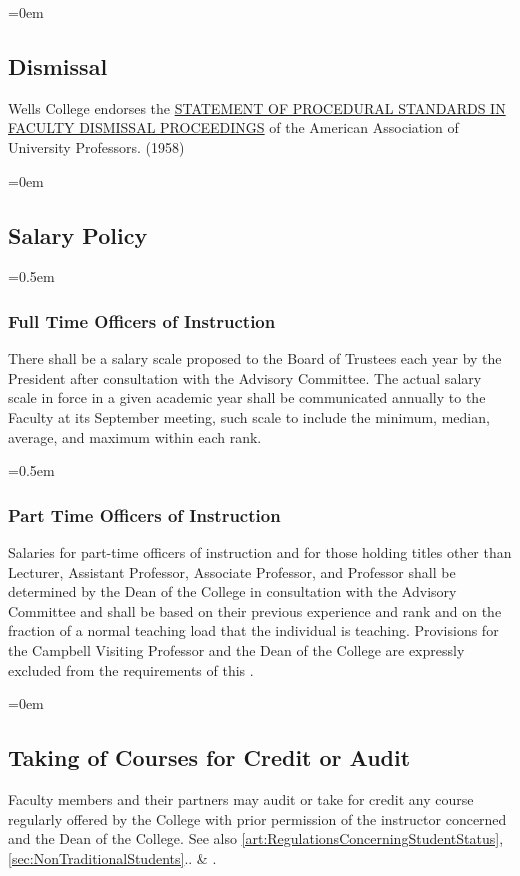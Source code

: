 \documentclass{manual}
\let\oldsubsection\subsection
\renewcommand\subsection{\leftskip=0em\oldsubsection}
\let\oldsubsubsection\subsubsection
\renewcommand\subsubsection{\leftskip=0.5em\oldsubsubsection}
\begin{document}
\subsection{Dismissal}\label{sec:Dismissal}
Wells College endorses the \href{http://www.aaup.org/AAUP/pubsres/policydocs/contents/statementon+proceduralstandardsinfaculty+dismissal+proceedings.htm}{STATEMENT OF PROCEDURAL STANDARDS IN FACULTY DISMISSAL PROCEEDINGS} of the American Association of University Professors. (1958)

\subsection{Salary Policy}\label{sec:SalaryPolicy}

\subsubsection{Full Time Officers of Instruction}
There shall be a salary scale proposed to the Board of Trustees each year by the President after consultation with the Advisory Committee.
The actual salary scale in force in a given academic year shall be communicated annually to the Faculty at its September meeting, such scale to include the minimum, median, average, and maximum within each rank.

\subsubsection{Part Time Officers of Instruction}
Salaries for part-time officers of instruction and for those holding titles other than Lecturer, Assistant Professor, Associate Professor, and Professor shall be determined by the Dean of the College in consultation with the Advisory Committee and shall be based on their previous experience and rank and on the fraction of a normal teaching load that the individual is teaching. Provisions for the Campbell Visiting Professor and the Dean of the College are expressly excluded from the requirements of this .

\subsection{Taking of Courses for Credit or Audit}
Faculty members and their partners may audit or take for credit any course regularly offered by the College with prior permission of the instructor concerned and the Dean of the College. See also \cref{art:RegulationsConcerningStudentStatus}, \cref{sec:NonTraditionalStudents}..  \& .
\end{document}
